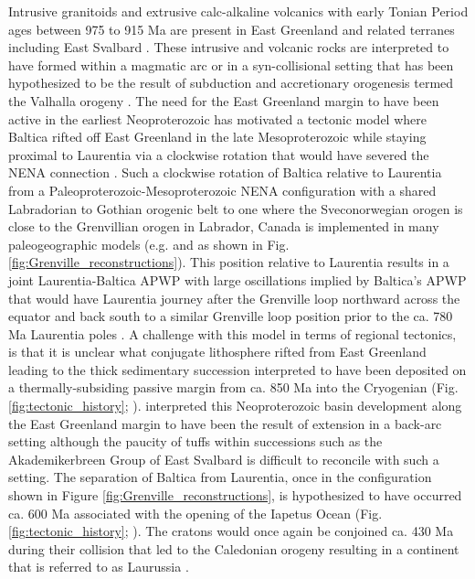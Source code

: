 \documentclass[twocolumn, switch]{article} %
\begin{document}
Intrusive granitoids and extrusive calc-alkaline volcanics with early Tonian Period ages between 975 to 915 Ma are present in East Greenland and related terranes including East Svalbard \citep{McClelland2019a}. These intrusive and volcanic rocks are interpreted to have formed within a magmatic arc or in a syn-collisional setting \citep{Johansson1999a} that has been hypothesized to be the result of subduction and accretionary orogenesis termed the Valhalla orogeny \citep{Cawood2010a}. The need for the East Greenland margin to have been active in the earliest Neoproterozoic has motivated a tectonic model where Baltica rifted off East Greenland in the late Mesoproterozoic while staying proximal to Laurentia via a clockwise rotation that would have severed the NENA connection \citep{Cawood2010a}. Such a clockwise rotation of Baltica relative to Laurentia from a Paleoproterozoic-Mesoproterozoic NENA configuration with a shared Labradorian to Gothian orogenic belt to one where the Sveconorwegian orogen is close to the Grenvillian orogen in Labrador, Canada is implemented in many paleogeographic models (e.g. \citealp{Evans2009a} and as shown in Fig. \ref{fig:Grenville_reconstructions}). This position relative to Laurentia results in a joint Laurentia-Baltica APWP with large oscillations implied by Baltica's APWP that would have Laurentia journey after the Grenville loop northward across the equator and back south to a similar Grenville loop position prior to the ca. 780 Ma Laurentia poles \citep{Evans2015a,Fairchild2017a}.  A challenge with this model in terms of regional tectonics, is that it is unclear what conjugate lithosphere rifted from East Greenland leading to the thick sedimentary succession interpreted to have been deposited on a thermally-subsiding passive margin from ca. 850 Ma into the Cryogenian (Fig. \ref{fig:tectonic_history}; \citealp{Maloof2006a}). \cite{Malone2014a} interpreted this Neoproterozoic basin development along the East Greenland margin to have been the result of extension in a back-arc setting although the paucity of tuffs within successions such as the Akademikerbreen Group of East Svalbard is difficult to reconcile with such a setting. The separation of Baltica from Laurentia, once in the configuration shown in Figure \ref{fig:Grenville_reconstructions}, is hypothesized to have occurred ca. 600 Ma associated with the opening of the Iapetus Ocean (Fig. \ref{fig:tectonic_history}; \citealp{Cawood2001a}). The cratons would once again be conjoined ca. 430 Ma during their collision that led to the Caledonian orogeny resulting in a continent that is referred to as Laurussia \citep{Torsvik2017a}.
\end{document}
